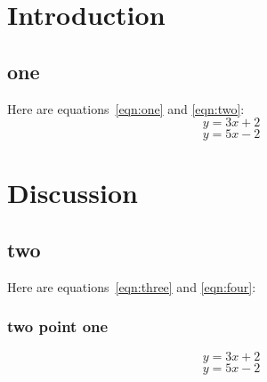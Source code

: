 \documentclass[11pt]{report}
\begin{document}
\chapter{Introduction}

\section{one}
Here are equations~\ref{eqn:one} and \ref{eqn:two}:
\begin{equation}
\label{eqn:one}y = 3x+2
\end{equation}
\begin{equation}
\label{eqn:two}y = 5x-2
\end{equation}

\chapter{Discussion}
\section{two}
Here are equations~\ref{eqn:three} and \ref{eqn:four}:
\subsection{two point one}
\begin{equation}
\label{eqn:three}y = 3x+2
\end{equation}
\begin{equation}
\label{eqn:four}y = 5x-2
\end{equation}
\end{document}
